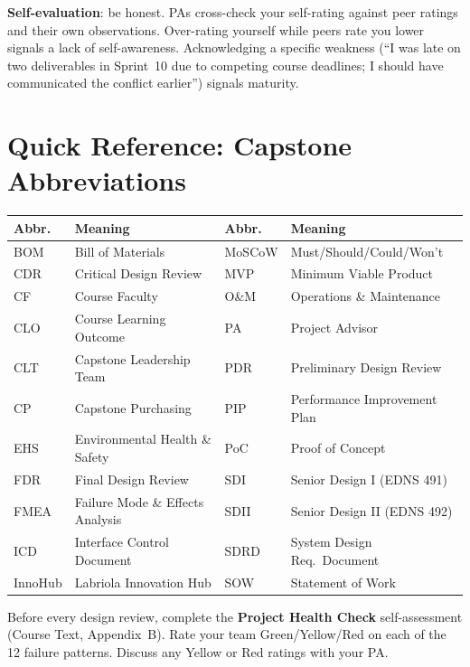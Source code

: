 \documentclass[11pt,letterpaper]{article}
\begin{document}
\textbf{Self-evaluation}: be honest. PAs cross-check your self-rating against peer ratings and their own observations. Over-rating yourself while peers rate you lower signals a lack of self-awareness. Acknowledging a specific weakness (``I was late on two deliverables in Sprint~10 due to competing course deadlines; I should have communicated the conflict earlier'') signals maturity.


\section{Quick Reference: Capstone Abbreviations}

\begin{center}\small
\begin{tabularx}{\textwidth}{lXlX}
\toprule
\textbf{Abbr.} & \textbf{Meaning} & \textbf{Abbr.} & \textbf{Meaning} \\
\midrule
BOM & Bill of Materials & MoSCoW & Must/Should/Could/Won't \\
CDR & Critical Design Review & MVP & Minimum Viable Product \\
CF & Course Faculty & O\&M & Operations \& Maintenance \\
CLO & Course Learning Outcome & PA & Project Advisor \\
CLT & Capstone Leadership Team & PDR & Preliminary Design Review \\
CP & Capstone Purchasing & PIP & Performance Improvement Plan \\
EHS & Environmental Health \& Safety & PoC & Proof of Concept \\
FDR & Final Design Review & SDI & Senior Design I (EDNS 491) \\
FMEA & Failure Mode \& Effects Analysis & SDII & Senior Design II (EDNS 492) \\
ICD & Interface Control Document & SDRD & System Design Req.\ Document \\
InnoHub & Labriola Innovation Hub & SOW & Statement of Work \\
\bottomrule
\end{tabularx}
\end{center}


\begin{warnbox}
Before every design review, complete the \textbf{Project Health Check} self-assessment (Course Text, Appendix~B). Rate your team Green/Yellow/Red on each of the 12 failure patterns. Discuss any Yellow or Red ratings with your PA.
\end{warnbox}
\end{document}
